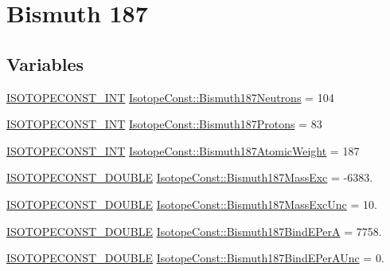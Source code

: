 \hypertarget{group___isotope_const-_bismuth-_bi187}{}\section{Bismuth 187}
\label{group___isotope_const-_bismuth-_bi187}
\subsection*{Variables}
\begin{DoxyCompactItemize}
\item 
\mbox{\hyperlink{group___isotope_const-_macros_ga5f18360b3e99483a35c32d789e62621c}{I\+S\+O\+T\+O\+P\+E\+C\+O\+N\+S\+T\+\_\+\+I\+NT}} \mbox{\hyperlink{group___isotope_const-_bismuth-_bi187_gafad61e6e12be4c19be720d58a350fbe2}{Isotope\+Const\+::\+Bismuth187\+Neutrons}} = 104
\item 
\mbox{\hyperlink{group___isotope_const-_macros_ga5f18360b3e99483a35c32d789e62621c}{I\+S\+O\+T\+O\+P\+E\+C\+O\+N\+S\+T\+\_\+\+I\+NT}} \mbox{\hyperlink{group___isotope_const-_bismuth-_bi187_ga8c23acebd2507c6d5f99ab06dd7536f1}{Isotope\+Const\+::\+Bismuth187\+Protons}} = 83
\item 
\mbox{\hyperlink{group___isotope_const-_macros_ga5f18360b3e99483a35c32d789e62621c}{I\+S\+O\+T\+O\+P\+E\+C\+O\+N\+S\+T\+\_\+\+I\+NT}} \mbox{\hyperlink{group___isotope_const-_bismuth-_bi187_gad133335340a63f2aaf58a6598b7e61e9}{Isotope\+Const\+::\+Bismuth187\+Atomic\+Weight}} = 187
\item 
\mbox{\hyperlink{group___isotope_const-_macros_ga8f45a7272ce02c0b4c65c44636ed719a}{I\+S\+O\+T\+O\+P\+E\+C\+O\+N\+S\+T\+\_\+\+D\+O\+U\+B\+LE}} \mbox{\hyperlink{group___isotope_const-_bismuth-_bi187_ga2d6ce899f9f8292d91df96b113238602}{Isotope\+Const\+::\+Bismuth187\+Mass\+Exc}} = -\/6383.
\item 
\mbox{\hyperlink{group___isotope_const-_macros_ga8f45a7272ce02c0b4c65c44636ed719a}{I\+S\+O\+T\+O\+P\+E\+C\+O\+N\+S\+T\+\_\+\+D\+O\+U\+B\+LE}} \mbox{\hyperlink{group___isotope_const-_bismuth-_bi187_gaeb75f2af33b650f1789b2ca677d63083}{Isotope\+Const\+::\+Bismuth187\+Mass\+Exc\+Unc}} = 10.
\item 
\mbox{\hyperlink{group___isotope_const-_macros_ga8f45a7272ce02c0b4c65c44636ed719a}{I\+S\+O\+T\+O\+P\+E\+C\+O\+N\+S\+T\+\_\+\+D\+O\+U\+B\+LE}} \mbox{\hyperlink{group___isotope_const-_bismuth-_bi187_gab05107dbb9d85c5af3d3001d8681d978}{Isotope\+Const\+::\+Bismuth187\+Bind\+E\+PerA}} = 7758.
\item 
\mbox{\hyperlink{group___isotope_const-_macros_ga8f45a7272ce02c0b4c65c44636ed719a}{I\+S\+O\+T\+O\+P\+E\+C\+O\+N\+S\+T\+\_\+\+D\+O\+U\+B\+LE}} \mbox{\hyperlink{group___isotope_const-_bismuth-_bi187_ga8a50c2714817129fd4f49e072935c702}{Isotope\+Const\+::\+Bismuth187\+Bind\+E\+Per\+A\+Unc}} = 0.

\end{DoxyCompactItemize}
